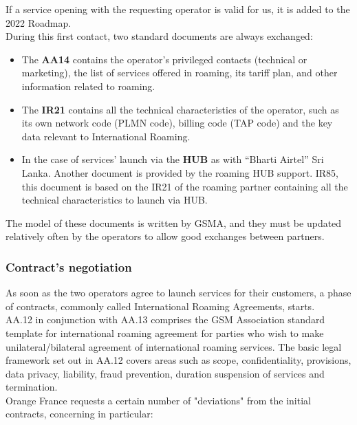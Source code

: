 If a service opening with the requesting operator is valid for us, it is added to the 2022 Roadmap.\\

During this first contact, two standard documents are always exchanged:
\begin{itemize}
    \setlength\itemsep{0.2em}
    \item The \textbf{AA14} contains the operator's privileged contacts (technical or marketing), the list of services offered in roaming, its tariff plan, and other information related to roaming.
    \item The \textbf{IR21} contains all the technical characteristics of the operator, such as its own network code (\acs{PLMN} code), billing code (\acs{TAP} code) and the key data relevant to International Roaming.
    \item In the case of services’ launch via the \textbf{HUB} as with “Bharti Airtel” Sri Lanka. Another document is provided by the roaming HUB support. IR85, this document is based on the IR21 of the roaming partner containing all the technical characteristics to launch via HUB. 
\end{itemize}

The model of these documents is written by GSMA, and they must be updated relatively often by the operators to allow good exchanges between partners.\\

\subsubsection{Contract’s negotiation}
\-\hspace{0.5cm} As soon as the two operators agree to launch services for their customers, a phase of contracts, commonly called International Roaming Agreements, starts.\\

AA.12 in conjunction with AA.13 comprises the \acs{GSM} Association standard template for international roaming agreement for parties who wish to make unilateral/bilateral agreement of international roaming services. The basic legal framework set out in AA.12 covers areas such as scope, confidentiality, provisions, data privacy, liability, fraud prevention, duration suspension of services and termination.\\

Orange France requests a certain number of "deviations" from the initial contracts, concerning in particular:

